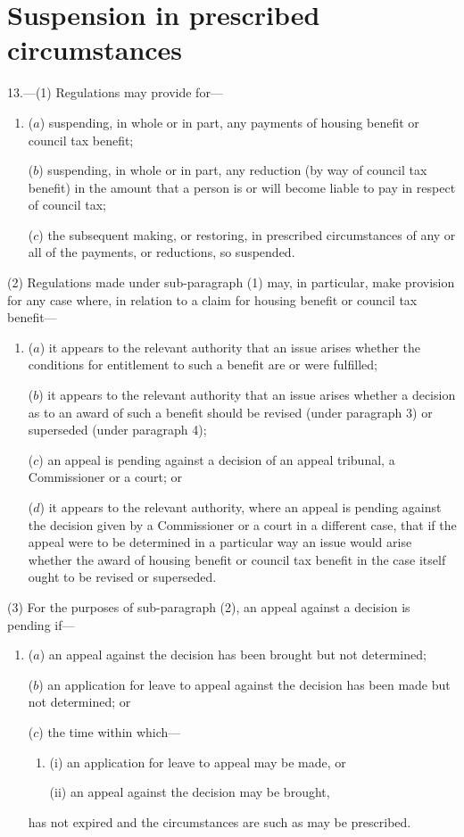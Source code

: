 \documentclass[12pt,a4paper]{article}
\begin{document}
\section*{Suspension in prescribed circumstances}

13.---(1) Regulations may provide for—
\begin{enumerate}\item[]
($a$) suspending, in whole or in part, any payments of housing benefit or council tax benefit;

($b$) suspending, in whole or in part, any reduction (by way of council tax benefit) in the amount that a person is or will become liable to pay in respect of council tax;

($c$) the subsequent making, or restoring, in prescribed circumstances of any or all of the payments, or reductions, so suspended.
\end{enumerate}

(2) Regulations made under sub-paragraph (1)  may, in particular, make provision for any case where, in relation to a claim for housing benefit or council tax benefit—
\begin{enumerate}\item[]
($a$) it appears to the relevant authority that an issue arises whether the conditions for entitlement to such a benefit are or were fulfilled;

($b$) it appears to the relevant authority that an issue arises whether a decision as to an award of such a benefit should be revised (under paragraph 3) or superseded (under paragraph 4);

($c$) an appeal is pending against a decision of an appeal tribunal, a Commissioner or a court; or

($d$) it appears to the relevant authority, where an appeal is pending against the decision given by a Commissioner or a court in a different case, that if the appeal were to be determined in a particular way an issue would arise whether the award of housing benefit or council tax benefit in the case itself ought to be revised or superseded.
\end{enumerate}

(3) For the purposes of sub-paragraph (2), an appeal against a decision is pending if—
\begin{enumerate}\item[]
($a$) an appeal against the decision has been brought but not determined;

($b$) an application for leave to appeal against the decision has been made but not determined; or

($c$) the time within which—
\begin{enumerate}\item[]
(i) an application for leave to appeal may be made, or

(ii) an appeal against the decision may be brought,
\end{enumerate}
has not expired and the circumstances are such as may be prescribed.
\end{enumerate}
\end{document}
